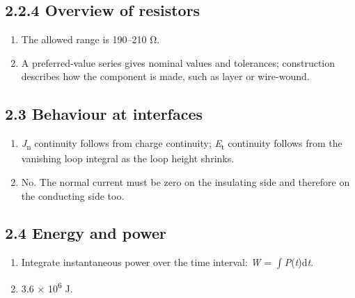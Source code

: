 \documentclass[11pt]{article}
\begin{document}
\begin{keepsection}\subsection{2.2.4 Overview of resistors}

\begin{enumerate}
\item The allowed range is 190–210 Ω.
\item A preferred-value series gives nominal values and tolerances; construction describes how the component is made, such as layer or wire-wound.
\end{enumerate}

\end{keepsection}
\begin{keepsection}\subsection{2.3 Behaviour at interfaces}

\begin{enumerate}
\item \textit{J}\textsubscript{n} continuity follows from charge continuity; \textit{E}\textsubscript{t} continuity follows from the vanishing loop integral as the loop height shrinks.
\item No. The normal current must be zero on the insulating side and therefore on the conducting side too.
\end{enumerate}

\end{keepsection}
\begin{keepsection}\subsection{2.4 Energy and power}

\begin{enumerate}
\item Integrate instantaneous power over the time interval: \textit{W} = $\int $\textit{P}(\textit{t})d\textit{t}.
\item 3.6 \ensuremath{\times} 10\textsuperscript{6} J.
\end{enumerate}

\end{keepsection}
\end{document}
